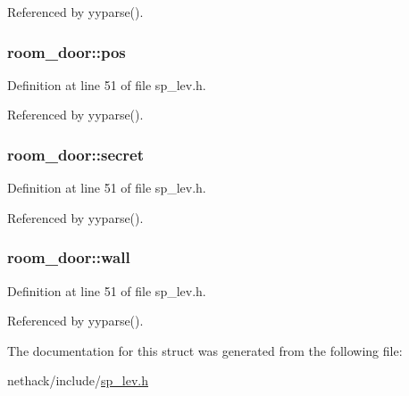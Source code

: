 Referenced by yyparse().

\hypertarget{structroom__door_abb4701d0723c3bf87ede3b5a27be2488}{
\subsubsection[{pos}]{ room\+\_\+door\+::pos}}\label{structroom__door_abb4701d0723c3bf87ede3b5a27be2488}


Definition at line 51 of file sp\+\_\+lev.\+h.



Referenced by yyparse().

\hypertarget{structroom__door_ad5d5bcf94d0f67472c5a17c3bc8907f1}{
\subsubsection[{secret}]{ room\+\_\+door\+::secret}}\label{structroom__door_ad5d5bcf94d0f67472c5a17c3bc8907f1}


Definition at line 51 of file sp\+\_\+lev.\+h.



Referenced by yyparse().

\hypertarget{structroom__door_a13f0f81ab36e5b33140d3987f76db7a7}{
\subsubsection[{wall}]{ room\+\_\+door\+::wall}}\label{structroom__door_a13f0f81ab36e5b33140d3987f76db7a7}


Definition at line 51 of file sp\+\_\+lev.\+h.



Referenced by yyparse().



The documentation for this struct was generated from the following file\+:\begin{DoxyCompactItemize}
\item 
nethack/include/\hyperlink{sp__lev_8h}{sp\+\_\+lev.\+h}\end{DoxyCompactItemize}
